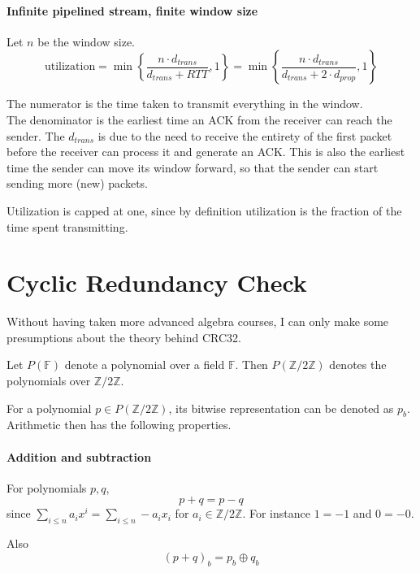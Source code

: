 \documentclass[a4paper]{article}
\newcommand{\set}[1]{\left\lbrace#1\right\rbrace} %
\newcommand{\cyclic}[1]{\mathbb{Z}/#1\mathbb{Z}}
\begin{document}
\paragraph{Infinite pipelined stream, finite window size} Let $n$ be the window size.
\begin{equation}
	\text{utilization} = \min\set{\frac{n\cdot d_{trans}}{d_{trans} + RTT}, 1} = \min\set{\frac{n\cdot d_{trans}}{d_{trans} + 2\cdot d_{prop}}, 1}
\end{equation}

The numerator is the time taken to transmit everything in the window.\\
The denominator is the earliest time an ACK from the receiver can reach the sender. The $d_{trans}$ is due to the need to receive the entirety of the first packet before the receiver can process it and generate an ACK. This is also the earliest time the sender can move its window forward, so that the sender can start sending more (new) packets.

Utilization is capped at one, since by definition utilization is the fraction of the time spent transmitting.

\section{Cyclic Redundancy Check}
Without having taken more advanced algebra courses, I can only make some presumptions about the theory behind CRC32.

Let $P(\mathbb{F})$ denote a polynomial over a field $\mathbb{F}$. Then $P(\cyclic{2})$ denotes the polynomials over $\cyclic{2}$.

For a polynomial $p\in P(\cyclic{2})$, its bitwise representation can be denoted as $p_b$. Arithmetic then has the following properties.

\paragraph{Addition and subtraction} For polynomials $p, q$,
\begin{equation}
	p + q = p - q
\end{equation}
since $\sum_{i\leq n}a_ix^i = \sum_{i\leq n}-a_ix_i$ for $a_i\in \cyclic{2}$. For instance $1 = -1$ and $0 = -0$.

Also
\begin{equation}
	(p + q)_b = p_b \oplus q_b
\end{equation}
\end{document}

